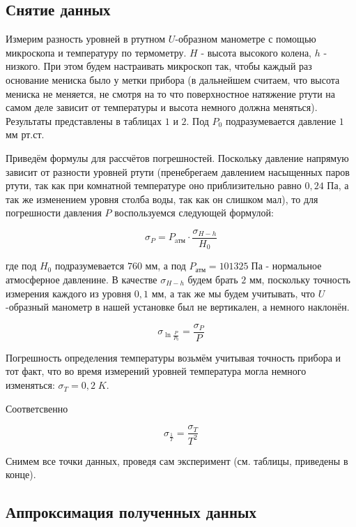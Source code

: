 \documentclass[a4paper,11.5pt]{article} %
\begin{document}
\subsection{Снятие данных}

Измерим разность уровней в ртутном $U$-образном манометре с помощью микроскопа и температуру по термометру. $H$ - высота высокого колена, $h$ - низкого. При этом будем настраивать микроскоп так, чтобы каждый раз основание мениска было у метки прибора (в дальнейшем считаем, что высота мениска не меняется, не смотря на то что поверхностное натяжение ртути на самом деле зависит от температуры и высота немного должна меняться). Результаты представлены в таблицах $1$ и $2$. Под $P_0$ подразумевается давление $1$ мм рт.ст.

Приведём формулы для рассчётов погрешностей.
Поскольку давление напрямую зависит от разности уровней ртути (пренебрегаем давлением насыщенных паров ртути, так как при комнатной температуре оно приблизительно равно $0,24$ Па, а так же изменением уровня столба воды, так как он слишком мал), то для погрешности давления $P$ воспользуемся следующей формулой: 

\begin{equation}
	\sigma_P = P_{\text{aтм}} \cdot \frac{\sigma_{H-h}}{H_0}
\end{equation}

где под $H_0$ подразумевается $760$ мм, а под $P_{\text{атм}} = 101325 \; \text{Па}$ - нормальное атмосферное давленине. В качестве $\sigma_{H-h}$ будем брать $2$ мм, поскольку точность измерения каждого из уровня $0,1$ мм, а так же мы будем учитывать, что $U$-образный манометр в нашей установке был не вертикален, а немного наклонён.

\begin{equation}
	\sigma_{\ln{\frac{P}{P_0}}} = \frac{\sigma_P}{P}
\end{equation}

Погрешность определения температуры возьмём учитывая точность прибора и тот факт, что во время измерений уровней температура могла немного изменяться: $\sigma_{T} = 0,2 \; K$.

Соответсвенно

\begin{equation}
	\sigma_{\frac{1}{T}} = \frac{\sigma_T}{T^2}
\end{equation}

Снимем все точки данных, проведя сам эксперимент (см. таблицы, приведены в конце).

\subsection{Аппроксимация полученных данных}
\end{document}
